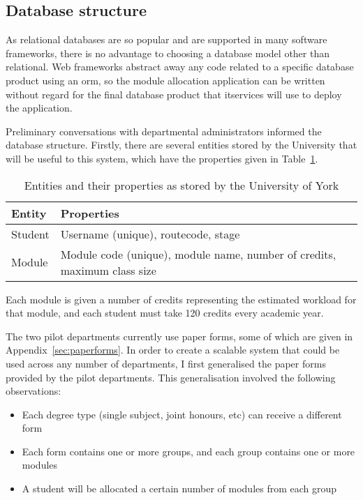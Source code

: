
\subsection{Database structure}

As relational databases are so popular and are supported in many software
frameworks, there is no advantage to choosing a database model other than
relational. Web frameworks abstract away any code related to a specific
database product using an \gls{orm}, so the module allocation application can
be written without regard for the final database product that \gls{itservices}
will use to deploy the application.

Preliminary conversations with departmental administrators informed the
database structure. Firstly, there are several entities stored by the
University that will be useful to this system, which have the properties given
in Table~\ref{development_database_uni_entities}.

\begin{table}
  \begin{center}
    \begin{tabular}{ | l | l | }
      \hline
      \textbf{Entity} & \textbf{Properties} \\
      \hline
      Student    & Username (unique), \gls{routecode}, \gls{stage} \\
      Module     & Module code (unique), module name, number of credits, maximum class size \\
      \hline
    \end{tabular}    
  \end{center}
  \caption{Entities and their properties as stored by the University of York}
  \label{development_database_uni_entities}
\end{table}

Each module is given a number of credits representing the estimated workload
for that module, and each student must take 120 credits every academic year.

The two pilot departments currently use paper forms, some of which are given
in Appendix~\ref{sec:paperforms}. In order to create a scalable system that
could be used across any number of departments, I first generalised the paper
forms provided by the pilot departments. This generalisation involved the
following observations:

\begin{itemize}
  \item Each degree type (single subject, joint honours, etc) can receive a different form
  \item Each form contains one or more groups, and each group contains one or more modules
  \item A student will be allocated a certain number of modules from each group
\end{itemize}

